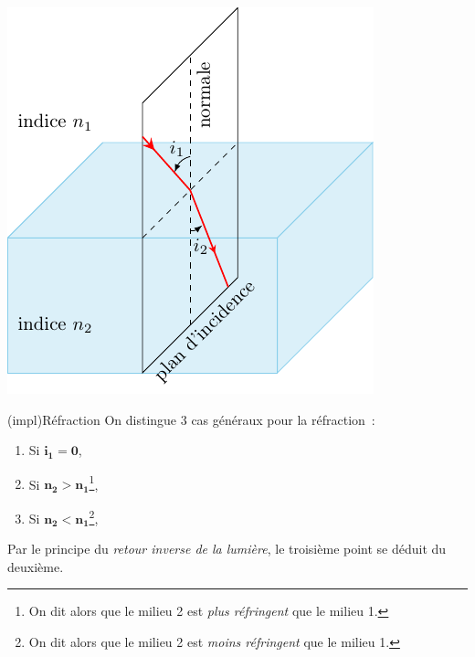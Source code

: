 \documentclass[../../main/main.tex]{subfiles}
\begin{document}
\begin{tcb*}[label=loi:snelldescartes]
	\hfill
	\begin{minipage}{0.45\linewidth}
		\begin{center}
			\includegraphics[width=\linewidth]{snell_refr_nsup}
			\label{fig:snell_refl}
		\end{center}
	\end{minipage}
\end{tcb*}

\begin{tcb*}[label=impl:refr](impl){Réfraction}
  On distingue 3 cas généraux pour la réfraction~:
  \begin{enumerate}
    \item Si $\mathbf{i_1 = 0}$,
    \item Si $\mathbf{n_2 > n_1}$\footnote{On dit alors que le milieu 2 est
            \textit{plus réfringent} que le milieu 1.},
    \item Si $\mathbf{n_2 < n_1}$\footnote{On dit alors que le milieu 2 est
            \textit{moins réfringent} que le milieu 1.},
  \end{enumerate}
  Par le principe du \textit{retour inverse de la lumière}, le troisième point
  se déduit du deuxième.
\end{tcb*}
\end{document}
